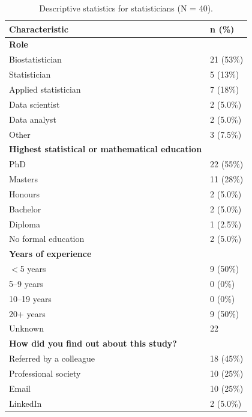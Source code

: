 \begin{table}[H]

\caption{Descriptive statistics for statisticians (N = 40).} 
\begin{tabular}{ll}
  \toprule
{\bf Characteristic} & {\bf n (\%) } \\ 
  \midrule
\textbf {Role} &  \\ 
  Biostatistician & 21 (53\%) \\ 
  Statistician & 5 (13\%) \\ 
  Applied statistician & 7 (18\%) \\ 
  Data scientist & 2 (5.0\%) \\ 
  Data analyst & 2 (5.0\%) \\ 
  Other & 3 (7.5\%) \\ 
  \textbf {Highest statistical or mathematical education} &  \\ 
  PhD & 22 (55\%) \\ 
  Masters & 11 (28\%) \\ 
  Honours & 2 (5.0\%) \\ 
  Bachelor & 2 (5.0\%) \\ 
  Diploma & 1 (2.5\%) \\ 
  No formal education & 2 (5.0\%) \\ 
  \textbf {Years of experience} &  \\ 
  $<$5 years & 9 (50\%) \\ 
  5--9 years & 0 (0\%) \\ 
  10--19 years & 0 (0\%) \\ 
  20+ years & 9 (50\%) \\ 
  Unknown & 22 \\ 
  \textbf {How did you find out about this study?} &  \\ 
  Referred by a colleague & 18 (45\%) \\ 
  Professional society & 10 (25\%) \\ 
  Email & 10 (25\%) \\ 
  LinkedIn & 2 (5.0\%) \\ 
   \bottomrule
\end{tabular}
\end{table}

